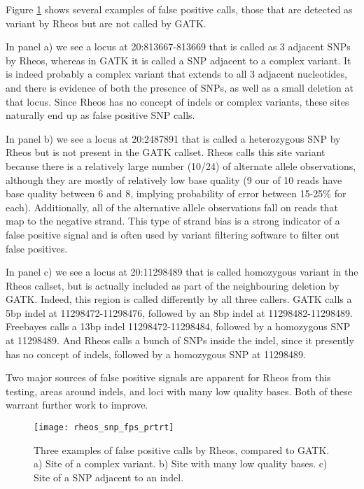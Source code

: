 Figure \ref{fig:rheos_snp_fps} shows several examples of false positive calls, those that are detected as variant by Rheos but are not called by GATK. 

In panel a) we see a locus at 20:813667-813669 that is called as 3 adjacent SNPs by Rheos, whereas in GATK it is called a SNP adjacent to a complex variant. It is indeed probably a complex variant that extends to all 3 adjacent nucleotides, and there is evidence of both the presence of SNPs, as well as a small deletion at that locus. Since Rheos has no concept of indels or complex variants, these sites naturally end up as false positive SNP calls. 

In panel b) we see a locus at 20:2487891 that is called a heterozygous SNP by Rheos but is not present in the GATK callset. Rheos calls this site variant because there is a relatively large number (10/24) of alternate allele observations, although they are mostly of relatively low base quality (9 our of 10 reads have base quality between 6 and 8, implying probability of error between 15-25\% for each). Additionally, all of the alternative allele observations fall on reads that map to the negative strand. This type of strand bias is a strong indicator of a false positive signal and is often used by variant filtering software to filter out false positives.

In panel c) we see a locus at 20:11298489 that is called homozygous variant in the Rheos callset, but is actually included as part of the neighbouring deletion by GATK. Indeed, this region is called differently by all three callers. GATK calls a 5bp indel at 11298472-11298476, followed by an 8bp indel at 11298482-11298489. Freebayes calls a 13bp indel 11298472-11298484, followed by a homozygous SNP at 11298489. And Rheos calls a bunch of SNPs inside the indel, since it presently has no concept of indels, followed by a homozygous SNP at 11298489. 

Two major sources of false positive signals are apparent for Rheos from this testing, areas around indels, and loci with many low quality bases. Both of these warrant further work to improve. 

\begin{figure}[h!]
    \texttt{[image: rheos\_snp\_fps\_prtrt]}
    \centering
    \caption {Three examples of false positive calls by Rheos, compared to GATK. a) Site of a complex variant. b) Site with many low quality bases. c) Site of a SNP adjacent to an indel.}
    \label{fig:rheos_snp_fps}
\end{figure}

